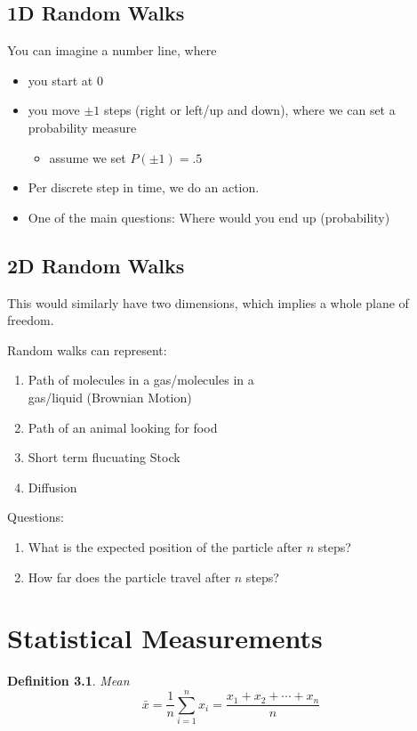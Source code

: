 \documentclass[12pt]{book}
\newtheorem*{defn*}{Definition}
\begin{document}
\section{1D Random Walks}
You can imagine a number line, where 
\begin{itemize}
\item you start at 0
\item you move $\pm 1$ steps (right or left/up and down), where we can set a probability measure
	\begin{itemize}
	\item assume we set $P(\pm 1)=.5$
	\end{itemize}
\item Per discrete step in time, we do an action. 
\item One of the main questions: Where would you end up (probability)
\end{itemize}



\section{2D Random Walks}

\hspace{\parindent}This would similarly have two dimensions, which implies a whole plane of freedom.

\noindent Random walks can represent: 
\begin{enumerate}
\item Path of molecules in a gas/molecules in a \\gas/liquid (Brownian Motion)
\item Path of an animal looking for food
\item Short term flucuating Stock
\item Diffusion 
\end{enumerate}

\noindent Questions:
\begin{enumerate}
\item What is the expected position of the particle after $n$ steps?
\item How far does the particle travel after $n$ steps?
\end{enumerate}










\chapter{Statistical Measurements}
\begin{defn*}Mean
$$\bar{x}=\frac{1}{n} \sum\limits_{i=1}^{n} x_{i}=\frac{x_{1}+x_{2}+\cdots+x_{n}}{n}$$
\end{defn*}
\end{document}
